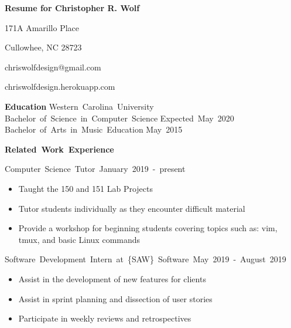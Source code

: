 \documentclass[10pt]{letter}
\begin{document}
    \thispagestyle{empty} %

    \centerline{\textbf{\large Resume for Christopher R. Wolf}}
    \centerline{171A Amarillo Place}
    \centerline{Cullowhee, NC 28723}
    \centerline{chriswolfdesign@gmail.com}
    \centerline{chriswolfdesign.herokuapp.com}

    \vspace{6 mm}
    \textbf{\large Education}
    \vspace{3 mm}
    \hbox{Western Carolina University}
    \linebreak
    \hbox{Bachelor of Science in Computer Science} \hspace{0pt} \hbox{Expected May 2020}
    \linebreak
    \hbox{Bachelor of Arts in Music Education} \hspace{215pt} \hbox{May 2015}

    \vspace{6 mm}
    \hbox{\textbf{\large {Related Work Experience}}}
    \vspace{3 mm}

    \hbox{Computer Science Tutor \hspace{260pt} January 2019 - present}
    \vspace{-3 mm}
    \begin{itemize}
        \itemsep 0em
        \item Taught the 150 and 151 Lab Projects
        \item Tutor students individually as they encounter difficult material
        \item Provide a workshop for beginning students covering topics such 
            as: vim, tmux, and basic Linux commands
    \end{itemize}

    \vspace{2 mm}
    \hbox{Software Development Intern at \{SAW\} Software \hspace{145pt}
        May 2019 - August 2019}
    \vspace{-3 mm}
    \begin{itemize}
        \itemsep 0em
        \item Assist in the development of new features for clients
        \item Assist in sprint planning and dissection of user stories
        \item Participate in weekly reviews and retrospectives
    \end{itemize}
\end{document}
